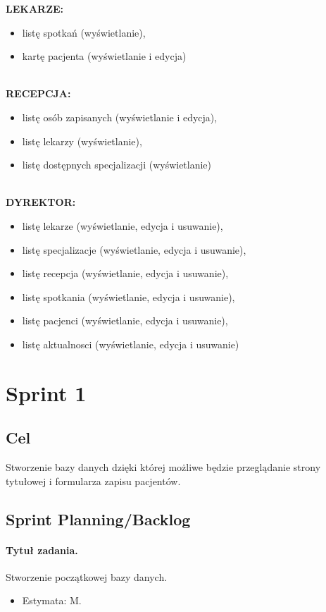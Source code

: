 \documentclass[a4paper]{article} \usepackage{polski} \usepackage[cp1250]{inputenc} \usepackage{url}
\begin{document}
\textbf{LEKARZE:}
\begin {itemize}
\item listę spotkań  (wyświetlanie),
\item kartę pacjenta (wyświetlanie i edycja)
\end {itemize}
\\
\textbf{RECEPCJA:}
\begin{itemize}
\item listę osób zapisanych (wyświetlanie i edycja),
\item listę lekarzy (wyświetlanie),
\item listę dostępnych specjalizacji (wyświetlanie)
\end {itemize}
\\
\textbf{DYREKTOR:}
\begin {itemize}
\item listę lekarze (wyświetlanie, edycja i usuwanie),
\item listę specjalizacje (wyświetlanie, edycja i usuwanie),
\item listę recepcja (wyświetlanie, edycja i usuwanie),
\item listę spotkania (wyświetlanie, edycja i usuwanie),
\item listę pacjenci (wyświetlanie, edycja i usuwanie),
\item listę aktualnosci (wyświetlanie, edycja i usuwanie)
\end {itemize}

\section{Sprint 1} \subsection{Cel} Stworzenie bazy danych dzięki której możliwe będzie przeglądanie strony tytułowej i formularza zapisu pacjentów. \subsection{Sprint Planning/Backlog}

\paragraph{Tytuł zadania.} Stworzenie początkowej bazy danych. \begin{itemize} \item Estymata: M. \end{itemize}
\end{document}
